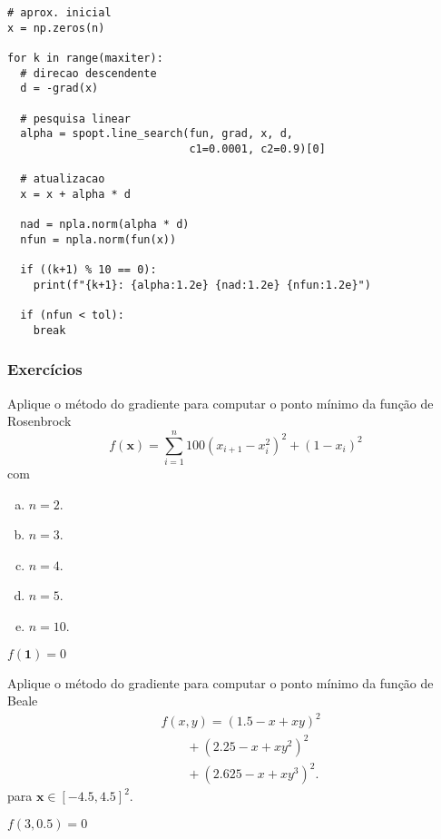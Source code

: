\begin{ex}
\begin{lstlisting}[caption=Algoritmo do Gradiente, label={lst:algOtimMG}]
# aprox. inicial
x = np.zeros(n)

for k in range(maxiter):
  # direcao descendente
  d = -grad(x)

  # pesquisa linear
  alpha = spopt.line_search(fun, grad, x, d, 
                            c1=0.0001, c2=0.9)[0]

  # atualizacao
  x = x + alpha * d

  nad = npla.norm(alpha * d)
  nfun = npla.norm(fun(x))

  if ((k+1) % 10 == 0):
    print(f"{k+1}: {alpha:1.2e} {nad:1.2e} {nfun:1.2e}")

  if (nfun < tol):
    break
\end{lstlisting}

\end{ex}

\subsubsection{Exercícios}
\badgeRevisar

\begin{exer}
  Aplique o método do gradiente para computar o ponto mínimo da função de Rosenbrock{\rosenbrock}
  \begin{equation}
    f(\pmb{x}) = \sum_{i=1}^n 100\left(x_{i+1}-x_i^2\right)^2 + (1-x_i)^2
  \end{equation}
  com
  \begin{enumerate}[a)]
    \item $n = 2$.
    \item $n = 3$.
    \item $n = 4$.
    \item $n = 5$.
    \item $n = 10$.
  \end{enumerate}
\end{exer}
\begin{resp}
$f(\pmb{1}) = 0$
\end{resp}

\begin{exer}
  Aplique o método do gradiente para computar o ponto mínimo da função de Beale \cite{Beale1955a}
  \begin{equation}
    \begin{aligned}
      & f(x,y) = (1.5-x+xy)^2 \\
      &\qquad + (2.25-x+xy^2)^2 \\
      &\qquad + (2.625-x+xy^3)^2.
    \end{aligned}
  \end{equation}
  para $\pmb{x}\in [-4.5, 4.5]^2$.
\end{exer}
\begin{resp}
  $f(3, 0.5) = 0$
\end{resp}

